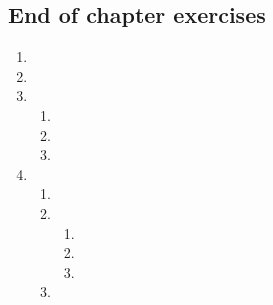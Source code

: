 \subsection{End of chapter exercises} %
  \begin{enumerate}[itemsep=6pt, label=\textbf{\arabic*}.]

  \item %

  \item %

  \item %

    
\begin{enumerate}[noitemsep, label=\textbf{(\alph*)} ]
    \item %
    \item %
    \item %
    \end{enumerate}

  \item %

     \begin{enumerate}[noitemsep, label=\textbf{(\alph*)} ]
    \item %
    \item %
      \begin{enumerate}[noitemsep, label=\textbf{\roman*}. ]
      \item %
      \item %
      \item %
      \end{enumerate}
\item %
    \end{enumerate}


\end{enumerate}
